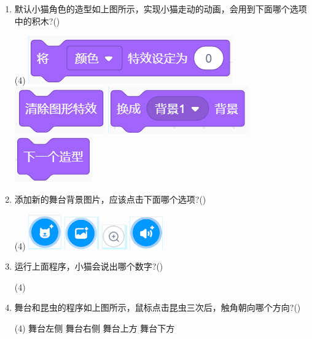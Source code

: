 \documentclass[10pt, a4paper]{article}
\begin{document}
\begin{enumerate}
        \item  默认小猫角色的造型如上图所示，实现小猫走动的动画，会用到下面哪个选项中的积木?(\qquad)
        \begin{tasks}(4)
            \task \includegraphics[width=.18\textwidth]{20a.png}
            \task \includegraphics[width=.1\textwidth]{20b.png}
            \task \includegraphics[width=.15\textwidth]{20c.png}
            \task \includegraphics[width=.08\textwidth]{20d.png}
        \end{tasks}

        \item 添加新的舞台背景图片，应该点击下面哪个选项?(\qquad)
        \begin{tasks}(4)
            \task \includegraphics[width=.04\textwidth]{21a.png}
            \task \includegraphics[width=.04\textwidth]{21b.png}
            \task \includegraphics[width=.04\textwidth]{21c.png}
            \task \includegraphics[width=.04\textwidth]{21d.png}
        \end{tasks}

        \item 运行上面程序，小猫会说出哪个数字?(\qquad)
        \begin{tasks}(4)
        \end{tasks}

        \item 舞台和昆虫的程序如上图所示，鼠标点击昆虫三次后，触角朝向哪个方向?(\qquad)
        \begin{tasks}(4)
            \task 舞台左侧
            \task 舞台右侧
            \task 舞台上方
            \task 舞台下方
        \end{tasks}


\end{enumerate}
\end{document}
